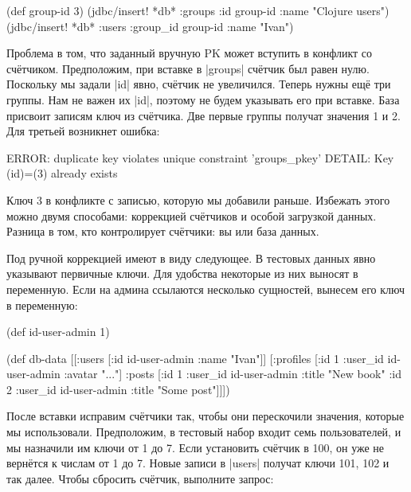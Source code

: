 \begin{english}
  \begin{clojure}
(def group-id 3)
(jdbc/insert! *db* :groups {:id group-id :name "Clojure users"})
(jdbc/insert! *db* :users {:group_id group-id :name "Ivan"})
  \end{clojure}
\end{english}

Проблема в том, что заданный вручную PK может вступить в конфликт со
сч\"{е}тчиком. Предположим, при вставке в \spverb|groups| сч\"{е}тчик был равен
нулю. Поскольку мы задали \spverb|id| явно, сч\"{е}тчик не увеличился. Теперь нужны
ещ\"{е} три группы. Нам не важен их \spverb|id|, поэтому не будем указывать его при
вставке. База присвоит записям ключ из сч\"{е}тчика. Две первые группы получат
значения 1 и 2. Для третьей возникнет ошибка:


\begin{english}
  \begin{text}
ERROR: duplicate key violates unique constraint 'groups_pkey'
DETAIL: Key (id)=(3) already exists
  \end{text}
\end{english}

Ключ 3 в конфликте с записью, которую мы добавили раньше. Избежать этого можно
двумя способами: коррекцией сч\"{е}тчиков и особой загрузкой данных. Разница в том,
кто контролирует сч\"{е}тчики: вы или база данных.

Под ручной коррекцией имеют в виду следующее. В тестовых данных явно указывают
первичные ключи. Для удобства некоторые из них выносят в переменную. Если на
админа ссылаются несколько сущностей, вынесем его ключ в переменную:

\begin{english}
  \begin{clojure}
(def id-user-admin 1)

(def db-data
  [[:users [{:id id-user-admin :name "Ivan"}]]
   [:profiles [{:id 1 :user_id id-user-admin :avatar "..."}]
    :posts [{:id 1 :user_id id-user-admin :title "New book"}
            {:id 2 :user_id id-user-admin :title "Some post"}]]])
  \end{clojure}
\end{english}


После вставки исправим сч\"{е}тчики так, чтобы они перескочили значения, которые мы
использовали. Предположим, в тестовый набор входит семь пользователей, и мы
назначили им ключи от 1 до 7. Если установить сч\"{е}тчик в 100, он уже не верн\"{е}тся
к числам от 1 до 7. Новые записи в \spverb|users| получат ключи 101, 102 и так
далее. Чтобы сбросить сч\"{е}тчик, выполните запрос:


